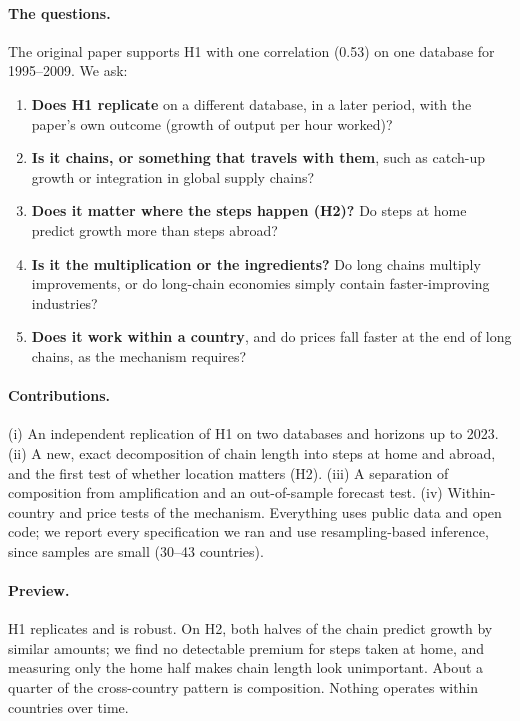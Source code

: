 \documentclass[11pt,a4paper]{article}
\begin{document}
\paragraph{The questions.} The original paper supports H1 with one correlation
(0.53) on one database for 1995--2009. We ask:
\begin{enumerate}
\item \textbf{Does H1 replicate} on a different database, in a later period, with
the paper's own outcome (growth of output per hour worked)?
\item \textbf{Is it chains, or something that travels with them}, such as catch-up
growth or integration in global supply chains?
\item \textbf{Does it matter where the steps happen (H2)?} Do steps at home predict
growth more than steps abroad?
\item \textbf{Is it the multiplication or the ingredients?} Do long chains multiply
improvements, or do long-chain economies simply contain faster-improving
industries?
\item \textbf{Does it work within a country}, and do prices fall faster at the end
of long chains, as the mechanism requires?
\end{enumerate}

\paragraph{Contributions.} (i) An independent replication of H1 on two databases
and horizons up to 2023. (ii) A new, exact decomposition of chain length into steps
at home and abroad, and the first test of whether location matters (H2). (iii) A
separation of composition from amplification and an out-of-sample forecast test.
(iv) Within-country and price tests of the mechanism. Everything uses public data
and open code; we report every specification we ran and use resampling-based
inference, since samples are small (30--43 countries).

\paragraph{Preview.} H1 replicates and is robust. On H2, both halves of the chain
predict growth by similar amounts; we find no detectable premium for steps taken
at home, and measuring only the home half makes chain length look unimportant.
About a quarter of the cross-country pattern is composition. Nothing operates
within countries over time.
\end{document}
